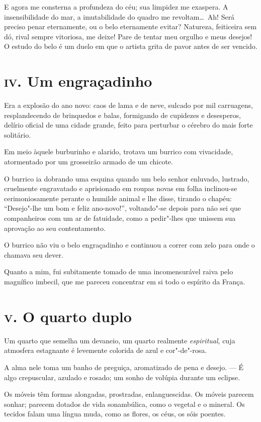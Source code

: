 E agora me consterna a profundeza do céu; sua limpidez me exaspera. A
insensibilidade do mar, a imutabilidade do quadro me revoltam\ldots\ 
Ah! Será preciso penar eternamente, ou o belo eternamente evitar?
Natureza, feiticeira sem dó, rival sempre vitoriosa, me deixe!
Pare de tentar meu orgulho e meus desejos! O estudo do belo é um duelo
em que o artista grita de pavor antes de ser vencido.

\chapter{\textsc{iv.} Um engraçadinho}

Era a explosão do ano novo: caos de lama e de neve, sulcado por mil
carruagens, resplandecendo de brinquedos e balas, formigando de
cupidezes e desesperos, delírio oficial de uma cidade grande, feito
para perturbar o cérebro do mais forte solitário.

Em meio àquele burburinho e alarido, trotava um burrico com
vivacidade, atormentado por um grosseirão armado de um chicote.

O burrico ia dobrando uma esquina quando um belo senhor enluvado,
lustrado, cruelmente engravatado e aprisionado em roupas novas em folha
inclinou-se cerimoniosamente perante o humilde animal e lhe disse,
tirando o chapéu: “Desejo"-lhe um bom e feliz ano-novo!”, 
voltando"-se depois para não sei que companheiros
com um ar de fatuidade, como a pedir"-lhes que unissem sua aprovação
ao seu contentamento.

O burrico não viu o belo engraçadinho e continuou a correr com zelo para
onde o chamava seu dever.

Quanto a mim, fui subitamente tomado de uma incomensurável raiva pelo
magnífico imbecil, que me pareceu concentrar em si todo o espírito da
França.

\chapter{\textsc{v.} O quarto duplo}

Um quarto que semelha um devaneio, um quarto realmente \textit{espiritual}, cuja
atmosfera estagnante é levemente colorida de azul e cor"-de"-rosa.

A alma nele toma um banho de preguiça, aromatizado de pena e
desejo. --- É algo crepuscular, azulado e rosado; um sonho de volúpia durante um
eclipse.

Os móveis têm formas alongadas, prostradas, enlanguescidas. Os
móveis parecem sonhar; parecem dotados de vida
sonambúlica, como o vegetal e o mineral. Os tecidos falam uma língua
muda, como as flores, os céus, os sóis poentes.


